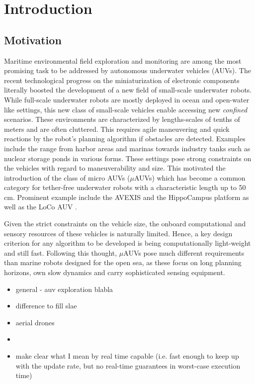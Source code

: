 \chapter{Introduction}\label{chap:introduction}

\section{Motivation}
Maritime environmental field exploration and monitoring are among the most promising task to be addressed by autonomous underwater vehicles (AUVs).
The recent technological progress on the miniaturization of electronic components literally boosted the development of a new field of small-scale underwater robots.
While full-scale underwater robots are mostly deployed in ocean and open-water like settings, this new class of small-scale vehicles enable accessing new \textit{confined} scenarios.
These environments are characterized by lengths-scales of tenths of meters and are often cluttered. 
This requires agile maneuvering and quick reactions by the robot’s planning algorithm if obstacles are detected.
Examples include the range from harbor areas and marinas towards industry tanks such as nuclear storage ponds in various forms.
These settings pose strong constraints on the vehicles with regard to maneuverability and size.
This motivated the introduction of the class of micro AUVs ($\mu$AUVs) which has become a common category for tether-free underwater robots with a characteristic length up to 50\,cm.
Prominent example include the AVEXIS \cite{Griffiths16} and the HippoCampus platform \cite{Duecker_AUV} as well as the LoCo AUV \cite{Edge20}.

Given the strict constraints on the vehicle size, the onboard computational and sensory resources of these vehicles is naturally limited.
Hence, a key design criterion for any algorithm to be developed is being computationally light-weight and still fast. 
Following this thought, $\mu$AUVs pose much different requirements than marine robots designed for the open sea, as these focus on long planning horizons, own slow dynamics and carry sophisticated sensing equipment.

\begin{itemize}
    \item general - auv exploration blabla
    \item difference to fill slae
    \item aerial drones
    \item 
    \item make clear what I mean by real time capable (i.e. fast enough to keep up with the update rate, but no real-time guarantees in worst-case execution time)
\end{itemize}





